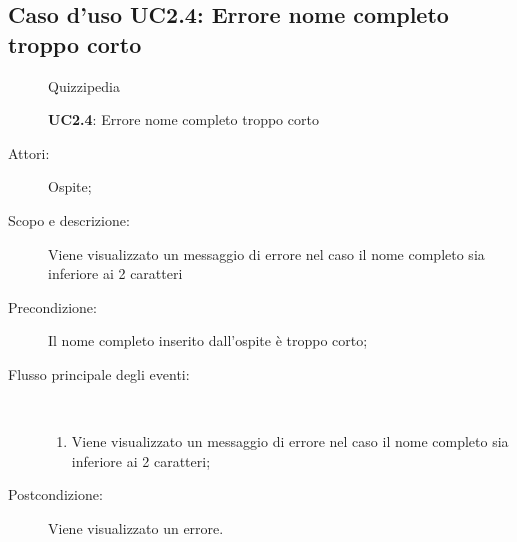 \subsection{Caso d'uso UC2.4: Errore nome completo troppo corto}
	\begin{figure}[H]
		\centering
		\begin{resizedtikzpicture}{\textwidth}
		\begin{umlsystem}[x=0, fill=lightgray!20]{Quizzipedia}
		\end{umlsystem}
		\end{resizedtikzpicture}
		\caption{\textbf{UC2.4}: Errore nome completo troppo corto}
		\label{UC2.4}
	\end{figure}
\begin{description}
\item[Attori:] Ospite;
\item[Scopo e descrizione:] Viene visualizzato un messaggio di errore nel caso il nome completo sia inferiore ai 2 caratteri
      \item[Precondizione:] Il nome completo inserito dall'ospite è troppo corto;

        \item[Flusso principale degli eventi:] \ 
 \begin{enumerate}
          \item Viene visualizzato un messaggio di errore nel caso il nome completo sia inferiore ai 2 caratteri;

      \end{enumerate}
    \item[Postcondizione:] Viene visualizzato un errore.
  \end{description}
\hypertarget{UC2.5}{}
